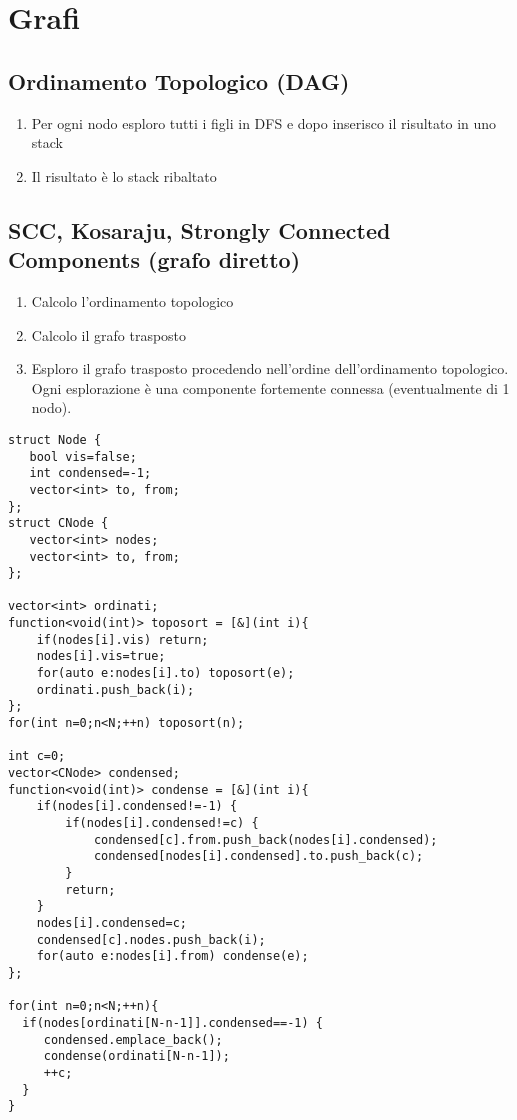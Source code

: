 \section{Grafi}

\subsection{Ordinamento Topologico (DAG)}
\begin{enumerate}
    \item Per ogni nodo esploro tutti i figli in DFS e dopo inserisco il risultato in uno stack
    \item Il risultato è lo stack ribaltato
\end{enumerate}

\subsection{SCC, Kosaraju, Strongly Connected Components (grafo diretto)}
\begin{enumerate}
    \item Calcolo l’ordinamento topologico
    \item Calcolo il grafo trasposto
    \item Esploro il grafo trasposto procedendo nell’ordine dell’ordinamento topologico. Ogni esplorazione è una componente fortemente connessa (eventualmente di 1 nodo).
\end{enumerate}
\begin{lstlisting}
struct Node {
   bool vis=false;
   int condensed=-1;
   vector<int> to, from;
};
struct CNode {
   vector<int> nodes;
   vector<int> to, from;
};

vector<int> ordinati;
function<void(int)> toposort = [&](int i){
    if(nodes[i].vis) return;
    nodes[i].vis=true;
    for(auto e:nodes[i].to) toposort(e);
    ordinati.push_back(i);
};
for(int n=0;n<N;++n) toposort(n);

int c=0;
vector<CNode> condensed;
function<void(int)> condense = [&](int i){
    if(nodes[i].condensed!=-1) {
        if(nodes[i].condensed!=c) {
            condensed[c].from.push_back(nodes[i].condensed);
            condensed[nodes[i].condensed].to.push_back(c);
        }
        return;
    }
    nodes[i].condensed=c;
    condensed[c].nodes.push_back(i);
    for(auto e:nodes[i].from) condense(e);
};

for(int n=0;n<N;++n){
  if(nodes[ordinati[N-n-1]].condensed==-1) {
     condensed.emplace_back();
     condense(ordinati[N-n-1]);
     ++c;
  }
}
\end{lstlisting}

